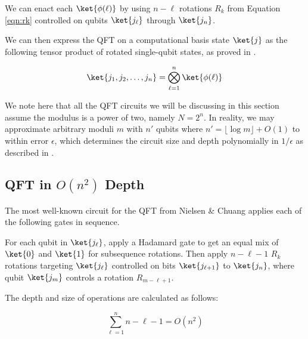 We can enact each $\ket{\phi(\ell)}$ by using $n-\ell$ rotations
$R_k$ from Equation \ref{eqn:rk} controlled on qubits $\ket{j_\ell}$
through $\ket{j_n}$.

We can then express the QFT on a computational basis state $\ket{j}$ as
the following tensor product of rotated single-qubit states, as proved in
\cite{Nielsen2000}.

\begin{equation}
\ket{j_1, j_2, \ldots, j_n} = \bigotimes_{\ell=1}^{n} \ket{\phi(\ell)}
\end{equation}


We note here that all the QFT circuits we will be discussing in this section
assume the modulus is a power of two, namely $N=2^n$. In reality, we may
approximate arbitrary moduli $m$ with $n'$ qubits where
$n' = \lfloor\log m\rfloor + O(1)$ to within error $\epsilon$, which determines
the circuit size and depth polynomially in $1/\epsilon$
as described in \cite{Cleve2000}.

\subsection{QFT in $O(n^2)$ Depth}

The most well-known circuit for the QFT from Nielsen \& Chuang
\cite{Nielsen2000} applies each of the following gates in sequence.

For each qubit in $\ket{j_\ell}$, apply a Hadamard gate to get an equal mix of
$\ket{0}$ and $\ket{1}$ for subsequence rotations. Then apply $n-\ell-1$
$R_k$ rotations targeting $\ket{j_\ell}$ controlled on bits $\ket{j_{\ell+1}}$
to $\ket{j_n}$, where qubit $\ket{j_m}$ controls a rotation $R_{m-\ell+1}$.


The depth and size of operations are calculated as follows:

\begin{equation}
\sum_{\ell=1}^n n-\ell-1 = O(n^2)
\end{equation}


